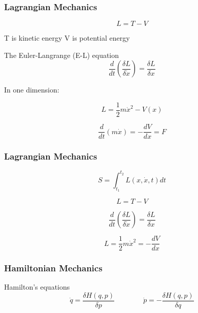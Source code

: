 \documentclass{beamer}
\begin{document}
\begin{frame}
\frametitle{Lagrangian Mechanics}
\begin{definition}
\[ L = T - V \]
\begin{center}
T is kinetic energy \qquad\qquad V is potential energy
\end{center}
\end{definition}

\begin{block}{The Euler-Langrange (E-L) equation}
\[ \frac{d}{dt}\left( \frac{\delta L}{\delta \dot x} \right) = \frac{\delta L}{\delta x} \]
\end{block}

\begin{center}

In one dimension:

\[ L = \frac{1}{2} m \dot x^2 - V(x) \]

\[ \frac{d}{dt}\left( m \dot x \right) = - \frac{d V}{d x} = F\]

\end{center}

\end{frame}

\begin{frame}
\frametitle{Lagrangian Mechanics}
\begin{definition}
\[ S = \int_{t_1}^{t_2} L(x, \dot x, t) dt \]
\end{definition}

\[ L = T - V \]

\[ \frac{d}{dt}\left( \frac{\delta L}{\delta \dot x} \right) = \frac{\delta L}{\delta x} \]

\[ L = \frac{1}{2} m \dot x^2 = - \frac{dV}{dx} \]

\end{frame}

\begin{frame}
\frametitle{Hamiltonian Mechanics}

\begin{block}{Hamilton's equations}
\[ \dot q = \frac{\delta H(q,p)}{\delta p} \qquad\qquad \dot p = - \frac{\delta H(q,p)}{\delta q} \]
\end{block}

\end{frame}
\end{document}
